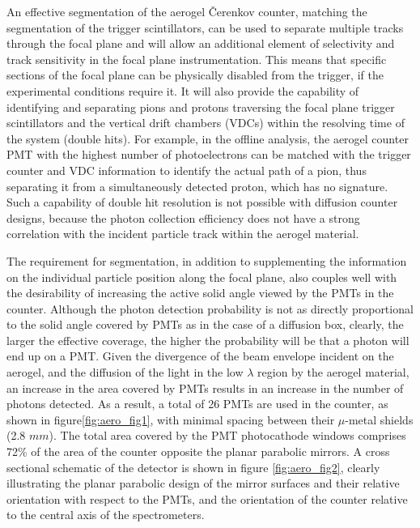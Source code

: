 An effective segmentation of the aerogel \v{C}erenkov counter, matching the 
segmentation of the trigger scintillators, can be used to separate multiple
tracks through the focal plane and will allow an additional element of
selectivity and track sensitivity in the focal plane instrumentation.  This
means that specific sections of the focal plane can be physically disabled from
the trigger, if the experimental conditions require it.  It will also provide
the capability of identifying and separating pions and protons traversing the
focal plane trigger scintillators and the vertical drift chambers (VDCs) within
the resolving time of the system (double hits).  
For example, in the offline
analysis, the aerogel counter PMT with the highest number of photoelectrons can
be matched with the trigger counter and VDC information to identify the actual
path of a pion, thus separating it from a simultaneously detected proton, which
has no \Cerenkov signature.  Such a capability of double hit resolution is
not possible with diffusion \Cerenkov counter designs, because the photon
collection efficiency does not have a strong correlation with the incident
particle track within the aerogel material. 
 
The requirement for segmentation, in addition to supplementing the information
on the individual particle position along the focal plane, also couples well
with the desirability of increasing the active solid angle viewed by the PMTs
in the counter.  Although the photon detection probability is not as directly
proportional to the solid angle covered by PMTs as in the case of a diffusion
box, clearly, the larger the effective coverage, the higher the probability
will be that a photon will end up on a PMT.  Given the divergence of the beam
envelope incident on the aerogel, and the diffusion of the light in the low
$\lambda$ region by the aerogel material, an increase in the area covered by
PMTs results in an increase in the number of photons detected.  As a result, a
total of 26 PMTs are used in the counter, as shown in figure\ref{fig:aero_fig1}, with minimal
spacing between their $\mu$-metal shields (2.8 $mm$).  The total area covered
by the PMT photocathode windows comprises 72\% of the area of the counter
opposite the planar parabolic mirrors.  A cross sectional schematic of the
detector is shown in figure \ref{fig:aero_fig2}, clearly illustrating the planar parabolic design
of the mirror surfaces and their relative orientation with respect to the PMTs,
and the orientation of the counter relative to the central axis of the
spectrometers. 
   

